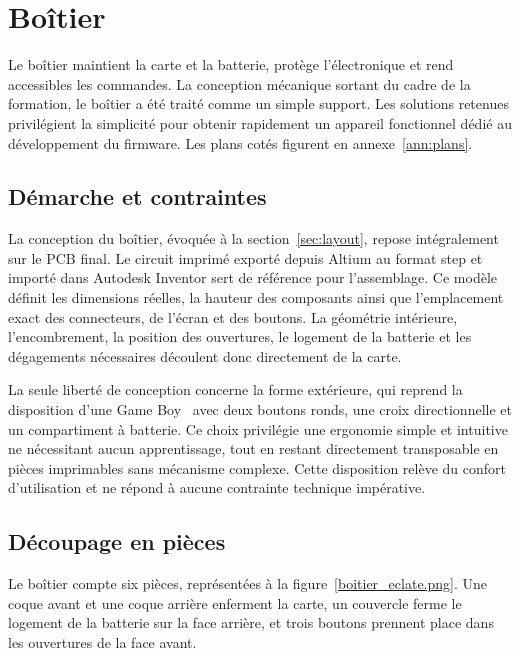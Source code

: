\section{Boîtier}
\label{sec:boitier}

Le boîtier maintient la carte et la batterie, protège l'électronique et rend accessibles les commandes. La conception mécanique sortant du cadre de la formation, le boîtier a été traité comme un simple support. Les solutions retenues privilégient la simplicité pour obtenir rapidement un appareil fonctionnel dédié au développement du firmware. Les plans cotés figurent en annexe~\ref{ann:plans}.

\subsection{Démarche et contraintes}
La conception du boîtier, évoquée à la section~\ref{sec:layout}, repose intégralement sur le PCB final. Le circuit imprimé exporté depuis Altium au format \gls{step} et importé dans Autodesk Inventor sert de référence pour l'assemblage. Ce modèle définit les dimensions réelles, la hauteur des composants ainsi que l'emplacement exact des connecteurs, de l'écran et des boutons. La géométrie intérieure, l'encombrement, la position des ouvertures, le logement de la batterie et les dégagements nécessaires découlent donc directement de la carte.

La seule liberté de conception concerne la forme extérieure, qui reprend la disposition d'une Game Boy~\cite{wikipedia_gameboy,copetti_gameboy_architecture} avec deux boutons ronds, une croix directionnelle et un compartiment à batterie. Ce choix privilégie une ergonomie simple et intuitive ne nécessitant aucun apprentissage, tout en restant directement transposable en pièces imprimables sans mécanisme complexe. Cette disposition relève du confort d'utilisation et ne répond à aucune contrainte technique impérative.

\subsection{Découpage en pièces}

Le boîtier compte six pièces, représentées à la figure~\ref{boitier_eclate.png}. Une coque avant et une coque arrière enferment la carte, un couvercle ferme le logement de la batterie sur la face arrière, et trois boutons prennent place dans les ouvertures de la face avant.


